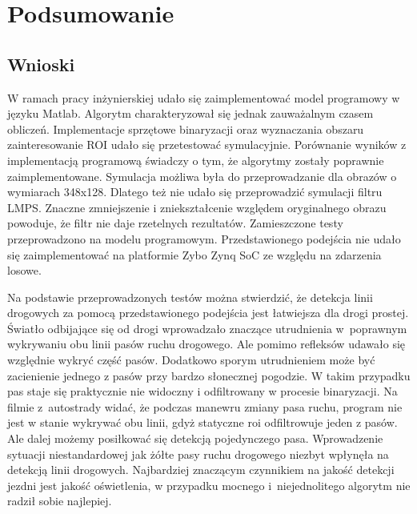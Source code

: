 \chapter{Podsumowanie}

\section{Wnioski}
W ramach pracy inżynierskiej udało się zaimplementować model programowy w języku Matlab. 
Algorytm charakteryzował się jednak zauważalnym czasem obliczeń. Implementacje sprzętowe binaryzacji oraz wyznaczania obszaru zainteresowanie ROI udało się przetestować symulacyjnie. Porównanie wyników z implementacją programową świadczy o tym, że algorytmy zostały poprawnie zaimplementowane.
Symulacja możliwa była do przeprowadzanie dla obrazów o wymiarach 348x128. Dlatego też nie udało się przeprowadzić symulacji filtru LMPS. Znaczne zmniejszenie i zniekształcenie względem oryginalnego obrazu powoduje, że filtr nie daje rzetelnych rezultatów. Zamieszczone testy przeprowadzono na modelu programowym.
Przedstawionego podejścia nie udało się zaimplementować na platformie Zybo Zynq SoC ze względu na zdarzenia losowe.

Na podstawie przeprowadzonych testów można stwierdzić, że detekcja linii drogowych za pomocą przedstawionego podejścia jest łatwiejsza dla drogi prostej.
Światło odbijające się od drogi wprowadzało znaczące utrudnienia w~poprawnym wykrywaniu obu linii pasów ruchu drogowego. Ale pomimo refleksów udawało się względnie wykryć część pasów.
Dodatkowo sporym utrudnieniem może być zacienienie jednego z pasów przy bardzo słonecznej pogodzie.
W takim przypadku pas staje się praktycznie nie widoczny i odfiltrowany w procesie binaryzacji.
Na filmie z~autostrady widać, że podczas manewru zmiany pasa ruchu, program nie jest w stanie wykrywać obu linii, gdyż statyczne roi odfiltrowuje jeden z pasów. Ale dalej możemy posiłkować się detekcją pojedynczego pasa.
Wprowadzenie sytuacji niestandardowej jak żółte pasy ruchu drogowego niezbyt wpłynęła na detekcją linii drogowych.
Najbardziej znaczącym czynnikiem na jakość detekcji jezdni jest jakość oświetlenia, w przypadku mocnego i~niejednolitego algorytm nie radził sobie najlepiej.